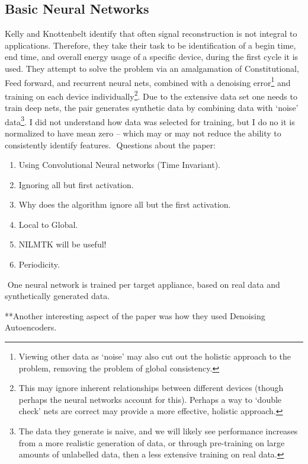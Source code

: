 \documentclass{article}
\begin{document}
\subsection{Basic Neural Networks}

Kelly and Knottenbelt identify that often signal reconstruction is not integral to applications. Therefore, they take their task to be identification of a begin time, end time, and overall energy usage of a specific device, during the first cycle it is used. They attempt to solve the problem via an amalgamation of Constitutional, Feed forward, and recurrent neural nets, combined with a denoising error\footnote{Viewing other data as `noise' may also cut out the holistic approach to the problem, removing the problem of global consistency.} and training on each device individually\footnote{This may ignore inherent relationships between different devices (though perhaps the neural networks account for this). Perhaps a way to `double check' nets are correct may provide a more effective, holistic approach.}. Due to the extensive data set one needs to train deep nets, the pair generates synthetic data by combining data with `noise' data\footnote{The data they generate is naive, and we will likely see performance increases from a more realistic generation of data, or through pre-training on large amounts of unlabelled data, then a less extensive training on real data.}. I did not understand how data was selected for training, but I do no it is normalized to have mean zero -- which may or may not reduce the ability to consistently identify features.
​
Questions about the paper:
%
\begin{enumerate}
	\item Using Convolutional Neural networks (Time Invariant).
	\item Ignoring all but first activation.
	\item Why does the algorithm ignore all but the first activation.
	\item Local to Global.
	\item NILMTK will be useful!
	\item Periodicity.
\end{enumerate}
​
One neural network is trained per target appliance, based on real data and synthetically generated data.

**Another interesting aspect of the paper was how they used Denoising Autoencoders.
​
\end{document}
